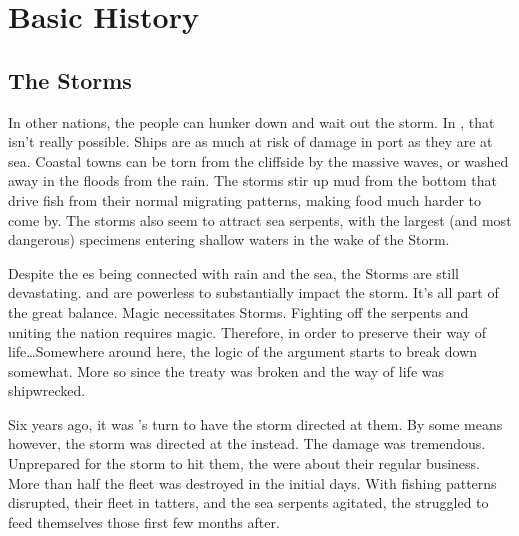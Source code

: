 \documentclass[blue]{GL2020}
\begin{document}
\name{\bVikings{}}

\section*{Basic History}


\subsection*{The Storms}
In other nations, the people can hunker down and wait out the storm. In \pShip{}, that isn't really possible. Ships are as much at risk of damage in port as they are at sea. Coastal towns can be torn from the cliffside by the massive waves, or washed away in the floods from the rain. The storms stir up mud from the bottom that drive fish from their normal migrating patterns, making food much harder to come by. The storms also seem to attract sea serpents, with the largest (and most dangerous) specimens entering shallow waters in the wake of the Storm.

Despite the \pShip{} \cEbb{\God}es being connected with rain and the sea, the Storms are still devastating. \cEbb{} and \cFlow{} are powerless to substantially impact the storm. It's all part of the great balance. Magic necessitates Storms. Fighting off the serpents and uniting the \pShip{} nation requires magic. Therefore, in order to preserve their way of life\ldots Somewhere around here, the logic of the argument starts to break down somewhat. More so since the treaty was broken and the \pShippies{} way of life was shipwrecked. %

Six years ago, it was \pTech{}'s turn to have the storm directed at them. By some means however, the storm was directed at the \pShip{} instead. %
The damage was tremendous. Unprepared for the storm to hit them, the \pShippies{} were about their regular business. More than half the fleet was destroyed in the initial days.  %
With fishing patterns disrupted, their fleet in tatters, and the sea serpents agitated, the \pShip{} struggled to feed themselves those first few months after.
\end{document}
